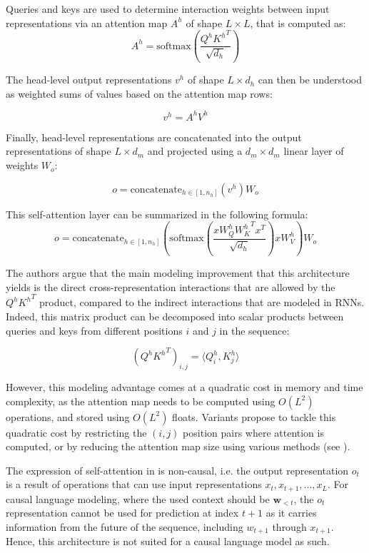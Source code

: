 Queries and keys are used to determine interaction weights between input representations via an attention map $A^h$ of shape $L \times L$, that is computed as:
$$
A^h = \text{softmax} \left(\frac{Q^h {K^h}^T}{\sqrt{d_h}}\right)
$$

The head-level output representations $v^h$ of shape $L \times d_h$ can then be understood as weighted sums of values based on the attention map rows:

$$
v^h = A^h V^h
$$

Finally, head-level representations are concatenated into the output representations of shape $L \times d_m$ and projected using a $d_m \times d_m$ linear layer of weights $W_o$:

$$
o = \text{concatenate}_{h\in [1, n_h]}(v^h) W_o
$$

This self-attention layer can be summarized in the following formula:
\begin{equation}
    \label{eq:self_attn}
o = \text{concatenate}_{h\in [1, n_h]} \left( \text{softmax} \left(\frac{x W_Q^h {W_K^h}^T x^T}{\sqrt{d_h}}\right) x W_V^h \right) W_o
\end{equation}


The authors argue that the main modeling improvement that this architecture yields is the direct cross-representation interactions that are allowed by the $Q^h {K^h}^T$ product, compared to the indirect interactions that are modeled in RNNs. Indeed, this matrix product can be decomposed into scalar products between queries and keys from different positions $i$ and $j$ in the sequence:

$$
(Q^h {K^h}^T)_{i, j} = \langle Q^h_i , K^h_j \rangle
$$

However, this modeling advantage comes at a quadratic cost in memory and time complexity, as the attention map needs to be computed using $O(L^2)$ operations, and stored using $O(L^2)$ floats. Variants propose to tackle this quadratic cost by restricting the $(i, j)$ position pairs where attention is computed, or by reducing the attention map size using various methods (see ).

The expression of self-attention in  is non-causal, i.e. the output representation $o_t$ is a result of operations that can use input representations $x_t, x_{t+1}, ..., x_L$. For causal language modeling, where the used context should be $\mathbf{w}_{< t}$, the $o_t$ representation cannot be used for prediction at index $t + 1$ as it carries information from the future of the sequence, including $w_{t+1}$ through $x_{t+1}$. Hence, this architecture is not suited for a causal language model as such.

